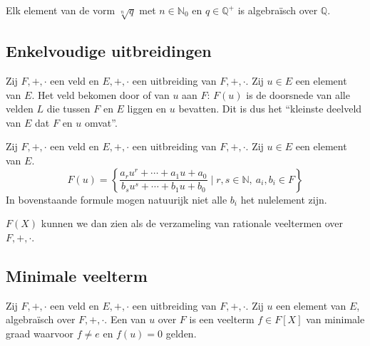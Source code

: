 \documentclass[main.tex]{subfiles}
\begin{document}
\begin{st}
  Elk element van de vorm $\sqrt[n]{q}$ met $n\in \mathbb{N}_{0}$ en $q\in \mathbb{Q}^{+}$ is algebra\"isch over $\mathbb{Q}$.
\end{st}

\subsection{Enkelvoudige uitbreidingen}
\label{sec:enkelv-uitbr}

\begin{de}
  Zij $F,+,\cdot$ een veld en $E,+,\cdot$ een uitbreiding van $F,+,\cdot$.
  Zij $u\in E$ een element van $E$.
  Het veld bekomen door  of  van $u$ aan $F$: $F(u)$ is de doorsnede van alle velden $L$ die tussen $F$ en $E$ liggen en $u$ bevatten.
  Dit is dus het ``kleinste deelveld van $E$ dat $F$ en $u$ omvat''.
\end{de}

\begin{ei}
  \label{ei:toevoeging-formule}
  Zij $F,+,\cdot$ een veld en $E,+,\cdot$ een uitbreiding van $F,+,\cdot$.
  Zij $u\in E$ een element van $E$.
  \[
  F(u) = 
  \left\{
      \frac
        {a_{r}u^{r} + \dotsb + a_{1} u + a_{0}}
        {b_{s}u^{s} + \dotsb + b_{1} u + b_{0}}
  \mid r,s \in \mathbb{N},\ a_{i},b_{i} \in F
  \right\}
  \]
  In bovenstaande formule mogen natuurijk niet alle $b_{i}$ het nulelement zijn.
\end{ei}

\begin{opm}
  $F(X)$ kunnen we dan zien als de verzameling van rationale veeltermen over $F,+,\cdot$.
\end{opm}

\subsection{Minimale veelterm}
\label{sec:minimale-veelterm}

\begin{de}
  Zij $F,+,\cdot$ een veld en $E,+,\cdot$ een uitbreiding van $F,+,\cdot$.
  Zij $u$ een element van $E$, algebra\"isch over $F,+,\cdot$.
  Een  van $u$ over $F$ is een veelterm $f\in F[X]$ van minimale graad waarvoor $f\neq e$ en $f(u) = 0$ gelden.
\end{de}
\end{document}
